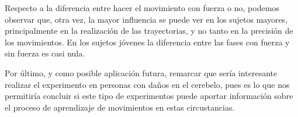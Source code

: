 \documentclass[a4paper,11pt, oneside]{book}
\begin{document}
Respecto a la diferencia entre hacer el movimiento con fuerza o no, podemos observar que, otra vez, la mayor influencia se puede ver en los sujetos mayores, principalmente en la realización de las trayectorias, y no tanto en la precisión de los movimientos. En los sujetos jóvenes la diferencia entre las fases con fuerza y sin fuerza es casi nula.

Por último, y como posible aplicación futura, remarcar que sería interesante realizar el experimento en personas con daños en el cerebelo, pues es lo que nos permitiría concluir si este tipo de experimentos puede aportar información sobre el proceso de aprendizaje de movimientos en estas circustancias.




\end{document}
